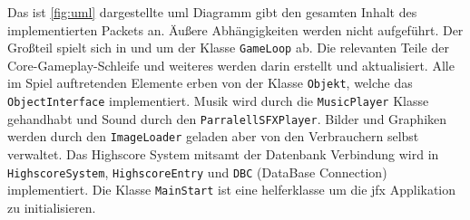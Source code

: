 Das ist \autoref{fig:uml} dargestellte \gls{uml} Diagramm gibt den gesamten Inhalt des implementierten Packets an.
Äußere Abhängigkeiten werden nicht aufgeführt.
Der Großteil spielt sich in und um der Klasse \texttt{GameLoop} ab.
Die relevanten Teile der Core-Gameplay-Schleife und weiteres werden darin erstellt und aktualisiert.
Alle im Spiel auftretenden Elemente erben von der Klasse \texttt{Objekt}, welche das \texttt{ObjectInterface} implementiert.
Musik wird durch die \texttt{MusicPlayer} Klasse gehandhabt und Sound durch den \texttt{ParralellSFXPlayer}.
Bilder und Graphiken werden durch den \texttt{ImageLoader} geladen aber von den Verbrauchern selbst verwaltet.
Das Highscore System mitsamt der Datenbank Verbindung wird in \texttt{HighscoreSystem}, \texttt{HighscoreEntry} und \texttt{DBC} (DataBase Connection) implementiert.
Die Klasse \texttt{MainStart} ist eine helferklasse um die \gls{jfx} Applikation zu initialisieren.

